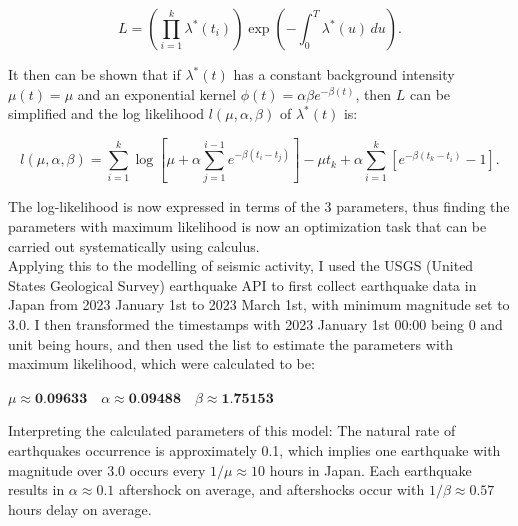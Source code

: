 \documentclass[landscape,final,a0paper]{../baposter}
\begin{document}
\begin{poster}
{\[
L = \left(\prod_{i=1}^k \lambda^*(t_i)\right) \exp \left(- \int_0^T \lambda^*(u) \, du\right).
\]


It then can be shown that if $\lambda^*(t)$ has a constant background intensity $\mu(t) = \mu$ and an exponential kernel $\phi(t) = \alpha \beta e^{-\beta (t)}$, then $L$ can be simplified and the log likelihood $l(\mu, \alpha, \beta)$ of $\lambda^*(t)$ is:

\[
l(\mu, \alpha, \beta) = \sum_{i=1}^k \log \left[ \mu + \alpha \sum_{j=1}^{i-1} e^{-\beta(t_i - t_j)} \right] - \mu t_k + {\alpha} \sum_{i=1}^k \left[ e^{-\beta(t_k - t_i)} - 1 \right].
\]

The log-likelihood is now expressed in terms of the 3 parameters, thus finding the parameters with maximum likelihood is now an optimization task that can be carried out systematically using calculus. \\

Applying this to the modelling of seismic activity, I used the USGS (United States Geological Survey) earthquake API to first collect earthquake data in Japan from 2023 January 1st to 2023 March 1st, with minimum magnitude set to 3.0. I then transformed the timestamps with 2023 January 1st 00:00 being 0 and unit being hours, and then used the list to estimate the parameters with maximum likelihood, which were calculated to be:

  \vspace{-2mm}
  \begin{center}
  $\mu \approx \textbf{0.09633} \quad \alpha \approx \textbf{0.09488} \quad \beta \approx \textbf{1.75153}$
  \end{center}

\vspace{-0.2em}

Interpreting the calculated parameters of this model: The natural rate of earthquakes occurrence is approximately 0.1, which implies one earthquake with magnitude over 3.0 occurs every $1/\mu \approx 10$ hours in Japan. Each earthquake results in $\alpha \approx 0.1$ aftershock on average, and aftershocks occur with $1/\beta \approx 0.57$ hours delay on average.


}

\end{poster}
\end{document}
